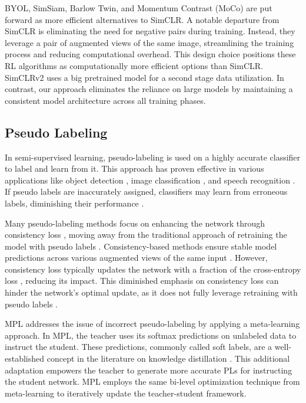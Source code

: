 BYOL, SimSiam, Barlow Twin, and Momentum Contrast (MoCo) \cite{he2019momentum} are put forward as more efficient alternatives to SimCLR. A notable departure from SimCLR is eliminating the need for negative pairs during training. Instead, they leverage a pair of augmented views of the same image, streamlining the training process and reducing computational overhead. This design choice positions these RL algorithms as computationally more efficient options than SimCLR. SimCLRv2 \cite{chen2020big} uses a big pretrained model for a second stage data utilization.  In contrast, our approach eliminates the reliance on large models by maintaining a consistent model architecture across all training phases.

\subsection{Pseudo Labeling}

In semi-supervised learning, pseudo-labeling is used on a highly accurate classifier to label and learn from it. This approach has proven effective in various applications like object detection \cite{li2022rethinking,yan2019semi}, image classification \cite{taherkhani2021self,wu2017semi}, and speech recognition \cite{lugosch2022pseudo}. If pseudo labels are inaccurately assigned, classifiers may learn from erroneous labels, diminishing their performance \cite{arazo2020pseudo}.

Many pseudo-labeling methods focus on enhancing the network through consistency loss \cite{zhang2021flexmatch}, moving away from the traditional approach of retraining the model with pseudo labels \cite{iscen2019label}. Consistency-based methods ensure stable model predictions across various augmented views of the same input \cite{rizve2021defense}. However, consistency loss typically updates the network with a fraction of the cross-entropy loss \cite{wang2023kd}, reducing its impact. This diminished emphasis on consistency loss can hinder the network's optimal update, as it does not fully leverage retraining with pseudo labels \cite{xie2020unsupervised}.

MPL addresses the issue of incorrect pseudo-labeling by applying a meta-learning \cite{lee2019meta} approach. In MPL, the teacher uses its softmax predictions on unlabeled data to instruct the student. These predictions, commonly called soft labels, are a well-established concept in the literature on knowledge distillation \cite{cho2019efficacy,phuong2019towards}. This additional adaptation empowers the teacher to generate more accurate PLs for instructing the student network. MPL employs the same bi-level optimization technique from meta-learning \cite{snell2017prototypical, nichol2018reptile, finn2017model} to iteratively update the teacher-student framework. 

